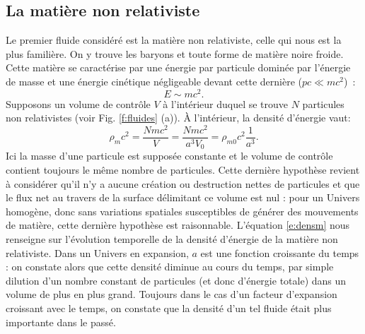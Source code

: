 \subsection{La matière non relativiste}
Le premier fluide considéré est la matière non relativiste, celle qui nous est la plus familière. On y trouve les baryons et toute forme de matière noire froide. Cette matière se caractérise par une énergie par particule dominée par l'énergie de masse et une énergie cinétique négligeable devant cette dernière ($pc\ll mc^2$)~:
\begin{equation}
E\sim mc^2.
\end{equation}
Supposons un volume de contrôle $V$ à l'intérieur duquel se trouve $N$ particules non relativistes (voir Fig. \ref{f:fluides} (a)). À l'intérieur, la densité d'énergie vaut:
\begin{equation}
\rho_m c^2=\frac{Nmc^2}{V}=\frac{Nmc^2}{a^3V_0}=\rho_{m0}c^2\frac{1}{a^3}.
\label{e:densm}
\end{equation}
Ici la masse d'une particule est supposée constante et le volume de contrôle contient toujours le même nombre de particules. Cette dernière hypothèse revient à considérer qu'il n'y a aucune création ou destruction nettes de particules et que le flux net au travers de la surface délimitant ce volume est nul : pour un Univers homogène, donc sans variations spatiales susceptibles de générer des mouvements de matière, cette dernière hypothèse est raisonnable. L'équation \ref{e:densm} nous renseigne sur l'évolution temporelle de la densité d'énergie de la matière non relativiste. Dans un Univers en expansion, $a$ est une fonction croissante du temps :  on constate alors que cette densité diminue au cours du temps, par simple dilution d'un nombre constant de particules (et donc d'énergie totale) dans un volume de plus en plus grand. Toujours dans le cas d'un facteur d'expansion croissant avec le temps, on constate que la densité d'un tel fluide était plus importante dans le passé.

